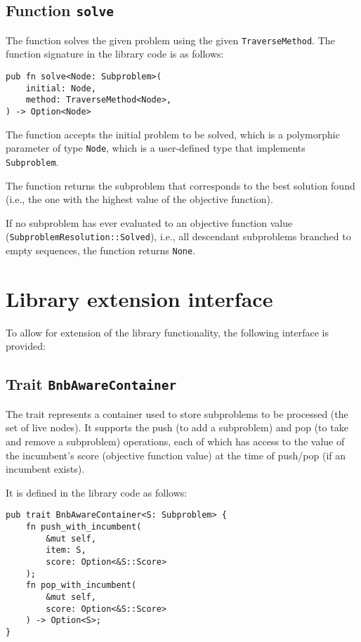 \subsection{Function \texttt{solve}}

The function solves the given problem using the given \texttt{TraverseMethod}.
The function signature in the library code is as follows:

\begin{lstlisting}[caption=Function \texttt{Solve}]
pub fn solve<Node: Subproblem>(
    initial: Node,
    method: TraverseMethod<Node>,
) -> Option<Node>
\end{lstlisting}

The function accepts the initial problem to be solved, which is a polymorphic
parameter of type \texttt{Node}, which is a user-defined type that implements
\texttt{Subproblem}.

The function returns the subproblem that corresponds to the best solution found
(i.e., the one with the highest value of the objective function).

If no subproblem has ever evaluated to an objective function value
(\texttt{SubproblemResolution::Solved}), i.e., all descendant subproblems branched to empty
sequences, the function returns \texttt{None}.

\section{Library extension interface}

To allow for extension of the library functionality, the following interface is provided:

\subsection{Trait \texttt{BnbAwareContainer}}

The trait represents a container used to store subproblems to be processed
(the set of live nodes). It supports the push (to add a subproblem) and pop (to take and
remove a subproblem) operations, each of which has access to the value of the incumbent's
score (objective function value) at the time of push/pop (if an incumbent exists).

It is defined in the library code as follows:

\begin{lstlisting}[caption=Trait \texttt{BnbAwareContainer}]
pub trait BnbAwareContainer<S: Subproblem> {
    fn push_with_incumbent(
        &mut self,
        item: S,
        score: Option<&S::Score>
    );
    fn pop_with_incumbent(
        &mut self,
        score: Option<&S::Score>
    ) -> Option<S>;
}
\end{lstlisting}

